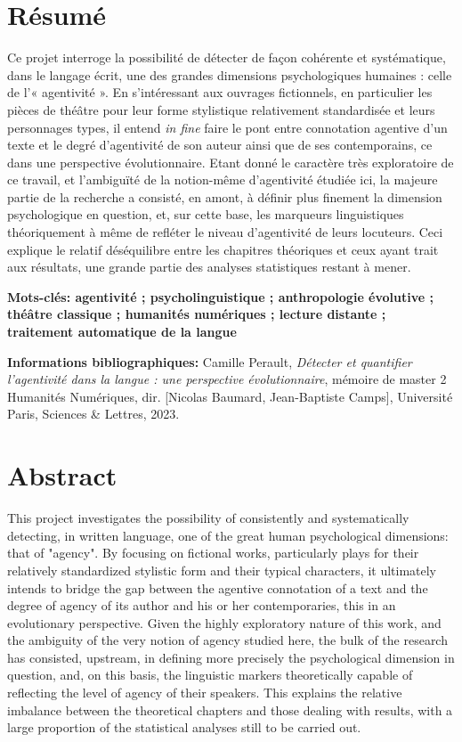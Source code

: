 \section*{Résumé}
Ce projet interroge la possibilité de détecter de façon cohérente et systématique, dans le langage écrit, une des grandes dimensions psychologiques humaines : celle de l’« agentivité ». En s’intéressant aux ouvrages fictionnels, en particulier les pièces de théâtre pour leur forme stylistique relativement standardisée et leurs personnages types, il entend \textit{in fine} faire le pont entre connotation agentive d’un texte et le degré d’agentivité de son auteur ainsi que de ses contemporains, ce dans une perspective évolutionnaire. Etant donné le caractère très exploratoire de ce travail, et l’ambiguïté de la notion-même d’agentivité étudiée ici, la majeure partie de la recherche a consisté, en amont, à définir plus finement la dimension psychologique en question, et, sur cette base, les marqueurs linguistiques théoriquement à même de refléter le niveau d’agentivité de leurs locuteurs. Ceci explique le relatif déséquilibre entre les chapitres théoriques et ceux ayant trait aux résultats, une grande partie des analyses statistiques restant à mener.


\medskip

\textbf{Mots-clés: agentivité ; psycholinguistique ; anthropologie évolutive ; théâtre classique ; humanités numériques ; lecture distante ; traitement automatique de la langue}

\textbf{Informations bibliographiques:} Camille Perault, \textit{Détecter et quantifier l'agentivité dans la langue : une perspective évolutionnaire}, mémoire de master 2 \og Humanités Numériques\fg{}, dir. [Nicolas Baumard, Jean-Baptiste Camps], Université Paris, Sciences \& Lettres, 2023.


\section*{Abstract}
This project investigates the possibility of consistently and systematically detecting, in written language, one of the great human psychological dimensions: that of "agency". By focusing on fictional works, particularly plays for their relatively standardized stylistic form and their typical characters, it ultimately intends to bridge the gap between the agentive connotation of a text and the degree of agency of its author and his or her contemporaries, this in an evolutionary perspective. Given the highly exploratory nature of this work, and the ambiguity of the very notion of agency studied here, the bulk of the research has consisted, upstream, in defining more precisely the psychological dimension in question, and, on this basis, the linguistic markers theoretically capable of reflecting the level of agency of their speakers. This explains the relative imbalance between the theoretical chapters and those dealing with results, with a large proportion of the statistical analyses still to be carried out.

